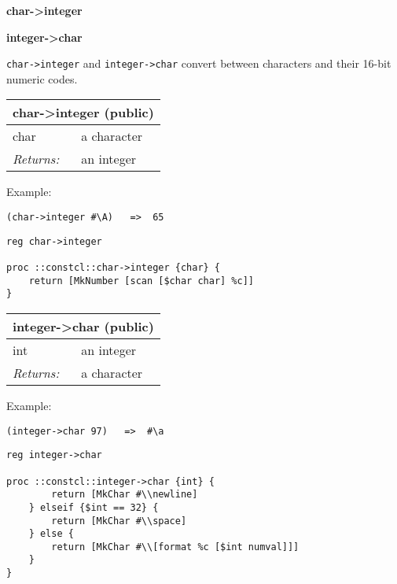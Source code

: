 \documentclass{report}
\begin{document}
\textbf{char->integer}


\textbf{integer->char}


\texttt{char->integer} and \texttt{integer->char} convert between characters and their 16-bit numeric codes.

\begin{tabular}{ |l l| }
\hline
\multicolumn{2}{|l|}{char->integer (public)} \\
\hline
char & a character \\
\textit{Returns:} & an integer \\
\hline
\end{tabular}


Example:

\noindent\makebox[\linewidth]{\rule{\linewidth}{0.4pt}}
\begin{lstlisting}
(char->integer #\A)   =>  65
\end{lstlisting}
\noindent\makebox[\linewidth]{\rule{\linewidth}{0.4pt}}
\noindent\makebox[\linewidth]{\rule{\linewidth}{0.4pt}}
\begin{lstlisting}
reg char->integer
 
proc ::constcl::char->integer {char} {
    return [MkNumber [scan [$char char] %c]]
}
\end{lstlisting}
\noindent\makebox[\linewidth]{\rule{\linewidth}{0.4pt}}
\begin{tabular}{ |l l| }
\hline
\multicolumn{2}{|l|}{integer->char (public)} \\
\hline
int & an integer \\
\textit{Returns:} & a character \\
\hline
\end{tabular}


Example:

\noindent\makebox[\linewidth]{\rule{\linewidth}{0.4pt}}
\begin{lstlisting}
(integer->char 97)   =>  #\a
\end{lstlisting}
\noindent\makebox[\linewidth]{\rule{\linewidth}{0.4pt}}
\noindent\makebox[\linewidth]{\rule{\linewidth}{0.4pt}}
\begin{lstlisting}
reg integer->char
 
proc ::constcl::integer->char {int} {
        return [MkChar #\\newline]
    } elseif {$int == 32} {
        return [MkChar #\\space]
    } else {
        return [MkChar #\\[format %c [$int numval]]]
    }
}
\end{lstlisting}
\noindent\makebox[\linewidth]{\rule{\linewidth}{0.4pt}}
\end{document}
